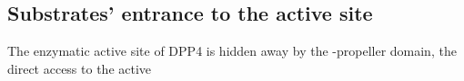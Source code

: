 \subsection{Substrates' entrance to the active site}

The enzymatic active site of DPP4 is hidden away by the \beta-propeller domain, the direct access to the active 